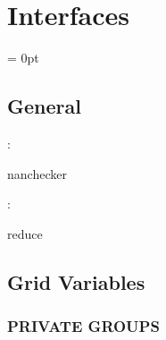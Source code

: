 
\section{Interfaces} 


\parskip = 0pt

\vspace{3mm} \subsection*{General}

: 

nanchecker
\vspace{2mm}

: 

reduce
\vspace{2mm}
\subsection*{Grid Variables}
\vspace{5mm}\subsubsection{PRIVATE GROUPS}

\vspace{5mm}

